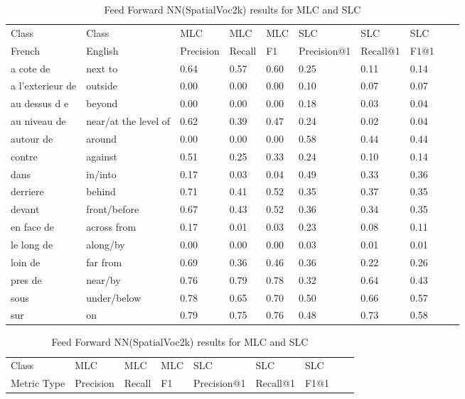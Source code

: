 \documentclass{csfyp}
\begin{document}
\begin{table}[!htbp]
\centering
\begin{tabular}{|l|l|l|l|l|l|l|l|l|l}
\cline{1-8}
Class & Class & MLC  &  MLC  &  MLC & SLC &  SLC & SLC \\ \cline{1-8}
French & English & Precision &  Recall    & F1 & Precision@1 & Recall@1 & F1@1 \\ \cline{1-8}
a cote de	&	next to	&	0.64	&	0.57	&	0.60	&	0.25	&	0.11	&	0.14 \\ \cline{1-8} 
a l'exterieur de	&	outside	&	0.00	&	0.00	&	0.00	&	0.10	&	0.07	&	0.07 \\ \cline{1-8}
au dessus d e	&	beyond	&	0.00	&	0.00	&	0.00	&	0.18	&	0.03	&	0.04 \\ \cline{1-8}
au niveau de	&	near/at the level of	&	0.62	&	0.39	&	0.47	&	0.24	&	0.02	&	0.04 \\ \cline{1-8}
autour de	&	around	&	0.00	&	0.00	&	0.00	&	0.58	&	0.44	&	0.44 \\ \cline{1-8}
contre	&	against	&	0.51	&	0.25	&	0.33	&	0.24	&	0.10	&	0.14 \\ \cline{1-8}
dans	&	in/into	&	0.17	&	0.03	&	0.04	&	0.49	&	0.33	&	0.36 \\ \cline{1-8}
derriere	&	behind	&	0.71	&	0.41	&	0.52	&	0.35	&	0.37	&	0.35 \\ \cline{1-8}
devant	&	front/before	&	0.67	&	0.43	&	0.52	&	0.36	&	0.34	&	0.35 \\ \cline{1-8}
en face de	&	across from	&	0.17	&	0.01	&	0.03	&	0.23	&	0.08	&	0.11 \\ \cline{1-8}
le long de	&	along/by	&	0.00	&	0.00	&	0.00	&	0.03	&	0.01	&	0.01\\ \cline{1-8} 
loin de	&	far from	&	0.69	&	0.36	&	0.46	&	0.36	&	0.22	&	0.26\\ \cline{1-8} 
pres de	&	near/by	&	0.76	&	0.79	&	0.78	&	0.32	&	0.64	&	0.43\\ \cline{1-8}
sous	&	under/below	&	0.78	&	0.65	&	0.70	&	0.50	&	0.66	&	0.57\\ \cline{1-8}
sur	&	on	&	0.79	&	0.75	&	0.76	&	0.48	&	0.73	&	0.58  \\ \cline{1-8}
\end{tabular}
\caption{Feed Forward NN(SpatialVoc2k) results for MLC and SLC}
\centering
\begin{tabular}{|l|l|l|l|l|l|l|l|l}
\cline{1-7}
Class &  MLC  &  MLC  &  MLC & SLC &  SLC & SLC \\ \cline{1-7}
Metric Type  & Precision &  Recall & F1 & Precision@1 & Recall@1 & F1@1 \\ \cline{1-7}

\end{tabular}
\end{table}
\end{document}
